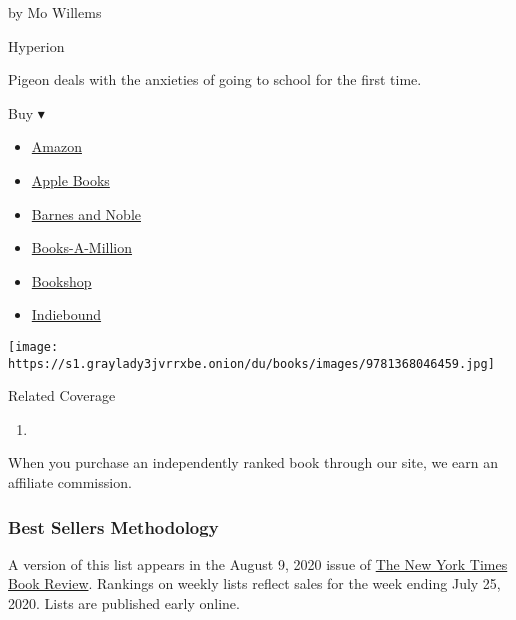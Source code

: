 \begin{enumerate}
  by Mo Willems

  Hyperion

  Pigeon deals with the anxieties of going to school for the first time.

  Buy ▾

  \begin{itemize}
  \tightlist
  \item
    \href{https://www.amazon.com/Pigeon-HAS-Go-School/dp/1368046452?tag=NYTBS-20}{Amazon}
  \item
    \href{https://du-gae-books-dot-nyt-du-prd.appspot.com/buy?title=THE+PIGEON+HAS+TO+GO+TO+SCHOOL\%21\&author=Mo+Willems}{Apple
    Books}
  \item
    \href{https://www.anrdoezrs.net/click-7990613-11819508?url=https\%3A\%2F\%2Fwww.barnesandnoble.com\%2Fw\%2F\%3Fean\%3D9781368046459}{Barnes
    and Noble}
  \item
    \href{https://www.anrdoezrs.net/click-7990613-35140?url=https\%3A\%2F\%2Fwww.booksamillion.com\%2Fp\%2FTHE\%2BPIGEON\%2BHAS\%2BTO\%2BGO\%2BTO\%2BSCHOOL\%2521\%2FMo\%2BWillems\%2F9781368046459}{Books-A-Million}
  \item
    \href{https://bookshop.org/a/3546/9781368046459}{Bookshop}
  \item
    \href{https://www.indiebound.org/book/9781368046459?aff=NYT}{Indiebound}
  \end{itemize}

  \texttt{[image: https://s1.graylady3jvrrxbe.onion/du/books/images/9781368046459.jpg]}
\end{enumerate}

Related Coverage

\begin{enumerate}
\def\labelenumi{\arabic{enumi}.}
\tightlist
\item
  \href{https://www.nytimes3xbfgragh.onion/2020/07/31/books/review/the-system-robert-reich-break-em-up-zephyr-teachout.html}{}
\end{enumerate}

When you purchase an independently ranked book through our site, we earn
an affiliate commission.

\hypertarget{best-sellers-methodology}{%
\subsubsection{Best Sellers
Methodology}\label{best-sellers-methodology}}

A version of this list appears in the August 9, 2020 issue of
\href{http://www.nytimes3xbfgragh.onion/section/books/review}{The New
York Times Book Review}. Rankings on weekly lists reflect sales for the
week ending July 25, 2020. Lists are published early online.


